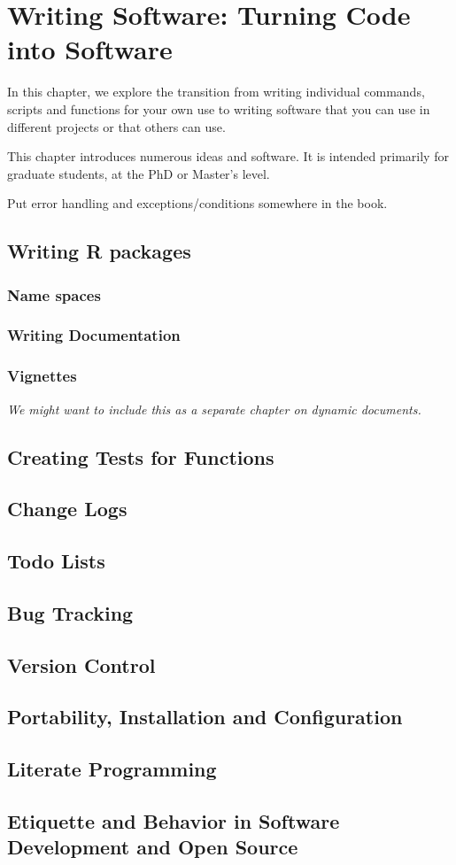 \chapter{Writing Software: Turning Code into Software}

In this chapter, we explore the transition from writing individual
commands, scripts and functions for your own use to writing software
that you can use in different projects or that others can use.

This chapter introduces numerous ideas and software.  It is intended
primarily for graduate students, at the PhD or Master's level.


Put error handling and exceptions/conditions somewhere in the book.

\section{Writing R packages} 

\subsection{Name spaces}

\subsection{Writing Documentation}

\subsection{Vignettes}
\textit{We might want to include this as a separate chapter
on dynamic documents.}

\section{Creating Tests for Functions}

\section{Change Logs}

\section{Todo Lists}

\section{Bug Tracking}

\section{Version Control}

\section{Portability, Installation and Configuration}

\section{Literate Programming}

\section{Etiquette and Behavior in Software Development and Open Source}